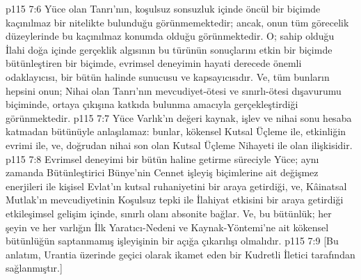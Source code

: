 \vs p115 7:6 Yüce olan Tanrı’nın, koşulsuz sonsuzluk içinde öncül bir biçimde kaçınılmaz bir nitelikte bulunduğu görünmemektedir; ancak, onun tüm görecelik düzeylerinde bu kaçınılmaz konumda olduğu görünmektedir. O; sahip olduğu İlahi doğa içinde gerçeklik algısının bu türünün sonuçlarını etkin bir biçimde bütünleştiren bir biçimde, evrimsel deneyimin hayati derecede önemli odaklayıcısı, bir bütün halinde sunucusu ve kapsayıcısıdır. Ve, tüm bunların hepsini onun; Nihai olan Tanrı’nın mevcudiyet\hyp{}ötesi ve sınırlı\hyp{}ötesi dışavurumu biçiminde,  ortaya çıkışına katkıda bulunma amacıyla gerçekleştirdiği görünmektedir.
\vs p115 7:7 Yüce Varlık’ın değeri kaynak, işlev ve nihai sonu hesaba katmadan bütünüyle anlaşılamaz: bunlar, kökensel Kutsal Üçleme ile, etkinliğin evrimi ile, ve, doğrudan nihai son olan Kutsal Üçleme Nihayeti ile olan ilişkisidir.
\vs p115 7:8 Evrimsel deneyimi bir bütün haline getirme süreciyle Yüce; aynı zamanda Bütünleştirici Bünye’nin Cennet işleyiş biçimlerine ait değişmez enerjileri ile kişisel Evlat’ın kutsal ruhaniyetini bir araya getirdiği, ve, Kâinatsal Mutlak’ın mevcudiyetinin Koşulsuz tepki ile İlahiyat etkisini bir araya getirdiği etkileşimsel gelişim içinde, sınırlı olanı absonite bağlar. Ve, bu bütünlük; her şeyin ve her varlığın İlk Yaratıcı\hyp{}Nedeni ve Kaynak\hyp{}Yöntemi’ne ait kökensel bütünlüğün saptanmamış işleyişinin bir açığa çıkarılışı olmalıdır.
\vs p115 7:9 [Bu anlatım, Urantia üzerinde geçici olarak ikamet eden bir Kudretli İletici tarafından sağlanmıştır.]
